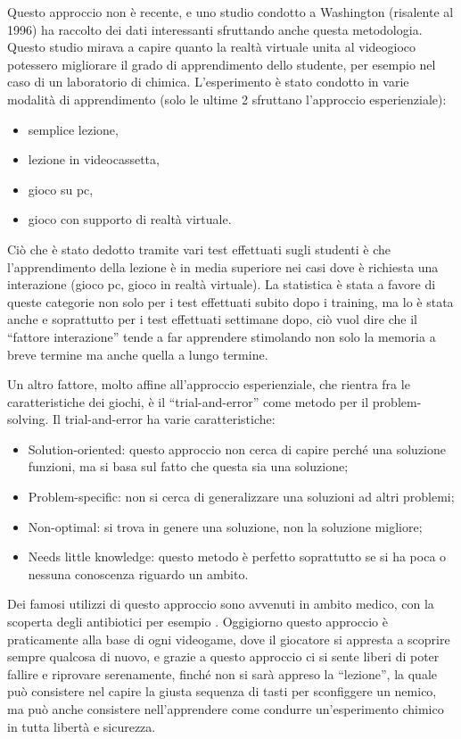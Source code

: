 Questo approccio non è recente, e uno studio condotto a Washington \cite{vreduchristine} (risalente al 1996) ha raccolto dei dati interessanti sfruttando anche questa metodologia.
Questo studio mirava a capire quanto la realtà virtuale unita al videogioco potessero migliorare il grado di apprendimento dello studente, per esempio nel caso di un laboratorio di chimica. L'esperimento è stato condotto in varie modalità di apprendimento (solo le ultime 2 sfruttano l'approccio esperienziale): 

\begin{itemize}
\item semplice lezione,
\item lezione in videocassetta, 
\item gioco su pc, 
\item gioco con supporto di realtà virtuale.
\end{itemize}

Ciò che è stato dedotto tramite vari test effettuati sugli studenti è che l'apprendimento della lezione è in media superiore nei casi dove è richiesta una interazione (gioco pc, gioco in realtà virtuale). La statistica è stata a favore di queste categorie non solo per i test effettuati subito dopo i training, ma lo è stata anche e soprattutto per i test effettuati settimane dopo, ciò vuol dire che il ``fattore interazione'' tende a far apprendere stimolando non solo la memoria a breve termine ma anche quella a lungo termine.

Un altro fattore, molto affine all'approccio esperienziale, che rientra fra le caratteristiche dei giochi, è il ``trial-and-error'' come metodo per il problem-solving. Il trial-and-error \cite{trialanderror} ha varie caratteristiche: 

\begin{itemize}
\item Solution-oriented: questo approccio non cerca di capire perché una soluzione funzioni, ma si basa sul fatto che questa sia una soluzione;
\item Problem-specific: non si cerca di generalizzare una soluzioni ad altri problemi;
\item Non-optimal: si trova in genere una soluzione, non la soluzione migliore;
\item Needs little knowledge: questo metodo è perfetto soprattutto se si ha poca o nessuna conoscenza riguardo un ambito.
\end{itemize}

Dei famosi utilizzi di questo approccio sono avvenuti in ambito medico, con la scoperta degli antibiotici per esempio \cite{trialanderror}. Oggigiorno questo approccio è praticamente alla base di ogni videogame, dove il giocatore si appresta a scoprire sempre qualcosa di nuovo, e grazie a questo approccio ci si sente liberi di poter fallire e riprovare serenamente, finché non si sarà appreso la ``lezione'', la quale può consistere nel capire la giusta sequenza di tasti per sconfiggere un nemico, ma può anche consistere nell'apprendere come condurre un'esperimento chimico in tutta libertà e sicurezza.

